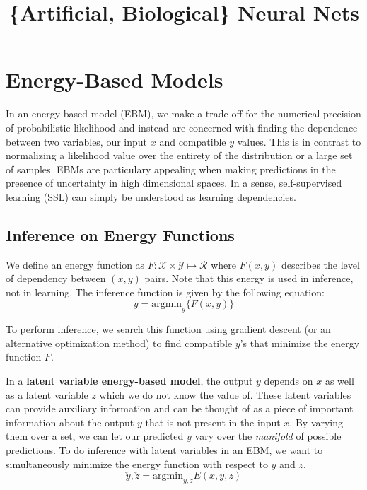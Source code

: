 \documentclass{article}
\title{\vspace{-3cm} \{Artificial, Biological\} Neural Nets }
\author{}
\date{}
\begin{document}
\maketitle
\vspace{-1.5cm}
\tableofcontents
\newpage

\section{Energy-Based Models}
In an energy-based model (EBM), we make a trade-off for the numerical precision of probabilistic likelihood and instead are concerned with finding the dependence between two variables, our input $x$ and compatible $y$ values. This is in contrast to normalizing a likelihood value over the entirety of the distribution or a large set of samples. EBMs are particulary appealing when making predictions in the presence of uncertainty in high dimensional spaces. In a sense, self-supervised learning (SSL) can simply be understood as learning dependencies.

\subsection{Inference on Energy Functions}
We define an energy function as $F: \mathcal X \times \mathcal Y \mapsto \mathcal R$ where $F(x,y)$ describes the level of dependency between $(x, y)$ pairs. Note that this energy is used in inference, not in learning. The inference function is given by the following equation:
\[
\check y = \text{argmin}_y\{ F(x,y)\}
\]

To perform inference, we search this function using gradient descent (or an alternative optimization method) to find compatible $y$’s that minimize the energy function $F$. 

In a \textbf{latent variable energy-based model}, the output $y$ depends on $x$ as well as a latent variable $z$ which we do not know the value of. These latent variables can provide auxiliary information and can be thought of as a piece of important information about the output $y$ that is not present in the input $x$. By varying them over a set, we can let our predicted $y$ vary over the \textit{manifold} of possible predictions. To do inference with latent variables in an EBM, we want to simultaneously minimize the energy function with respect to $y$ and $z$.
\[
\check y, \check z = \text{argmin}_{y,z} E(x,y,z)
\]
\end{document}
